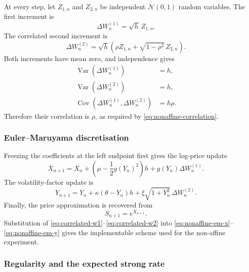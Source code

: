 At every step, let $Z_{1,n}$ and $Z_{2,n}$ be independent
$\mathcal{N}(0,1)$ random variables.  The first increment is
\begin{equation}
    \Delta W_n^{(1)}=\sqrt h\,Z_{1,n}.
    \label{eq:correlated-w1}
\end{equation}
The correlated second increment is
\begin{equation}
    \Delta W_n^{(2)}=\sqrt h\left(
       \rho Z_{1,n}+\sqrt{1-\rho^2}\,Z_{2,n}
    \right).
    \label{eq:correlated-w2}
\end{equation}
Both increments have mean zero, and independence gives
\begin{align}
    \operatorname{Var}(\Delta W_n^{(1)})&=h,\\
    \operatorname{Var}(\Delta W_n^{(2)})&=h,\\
    \operatorname{Cov}(\Delta W_n^{(1)},\Delta W_n^{(2)})
      &=h\rho.
\end{align}
Therefore their correlation is $\rho$, as required by
\eqref{eq:nonaffine-correlation}.

\subsubsection{Euler--Maruyama discretisation}

Freezing the coefficients at the left endpoint first gives the log-price
update
\begin{equation}
    X_{n+1}
      =X_n+\left(\mu-\frac12g(Y_n)^2\right)h
        +g(Y_n)\Delta W_n^{(1)}.
    \label{eq:nonaffine-em-x}
\end{equation}
The volatility-factor update is
\begin{equation}
    Y_{n+1}
      =Y_n+\kappa(\theta-Y_n)h
        +\xi\sqrt{1+Y_n^2}\,\Delta W_n^{(2)}.
    \label{eq:nonaffine-em-y}
\end{equation}
Finally, the price approximation is recovered from
\begin{equation}
    S_{n+1}=e^{X_{n+1}}.
    \label{eq:nonaffine-em-s}
\end{equation}
Substitution of \eqref{eq:correlated-w1}--\eqref{eq:correlated-w2} into
\eqref{eq:nonaffine-em-x}--\eqref{eq:nonaffine-em-y} gives the implementable
scheme used for the non-affine experiment.

\subsubsection{Regularity and the expected strong rate}

